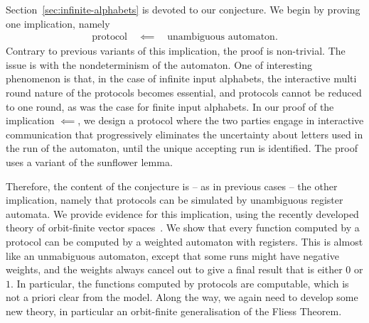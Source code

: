 Section~\ref{sec:infinite-alphabets} is devoted to our conjecture. We begin by proving one implication, namely 
\begin{align*}
\text{protocol} \quad \impliedby \quad \text{unambiguous automaton}.
\end{align*}
Contrary to  previous variants of this implication, the proof is non-trivial. The issue is with the nondeterminism of the automaton. One of  interesting phenomenon is that, in the case of infinite input alphabets, the interactive multi round nature of the protocols becomes essential, and protocols cannot be reduced to one round, as was the case for finite input alphabets. In our proof of the implication $\impliedby$, we design a protocol where  the two parties engage in interactive communication that progressively eliminates the uncertainty about letters used in the run of the automaton, until the unique accepting run is identified.
 The proof uses a variant of the sunflower lemma. 

Therefore,  the content of the conjecture is -- as in previous cases --  the other implication, namely that protocols can be simulated by unambiguous register automata. We provide evidence for this implication, using the recently developed theory of orbit-finite vector spaces~\cite{orbitFiniteVectorTheoretics}. We show that every function computed by a protocol can be computed by a weighted automaton with registers. This is almost like an unmabiguous automaton, except that some runs might have negative weights, and the weights always cancel out to give a final result that is either $0$ or $1$. In particular, the functions computed by protocols are computable, which is not a priori clear from the model. Along the way, we again need to develop some new theory, in particular an orbit-finite generalisation of the Fliess Theorem. 

